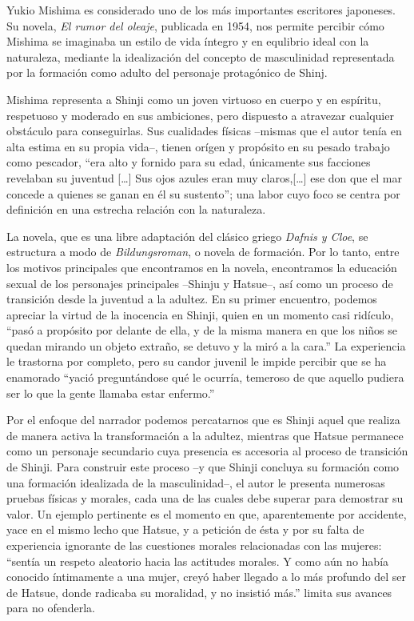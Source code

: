 Yukio Mishima es considerado uno de los más importantes escritores japoneses.
Su novela, \emph{El rumor del oleaje}, publicada en 1954,  nos permite percibir cómo Mishima se imaginaba un estilo de vida íntegro y en equlibrio ideal con la naturaleza, mediante la idealización del concepto de  masculinidad representada por la formación como adulto del  personaje protagónico de Shinj.

Mishima representa a Shinji como un joven virtuoso en cuerpo y en espíritu, respetuoso y moderado en sus ambiciones, pero dispuesto a atravezar cualquier obstáculo para conseguirlas. Sus cualidades físicas --mismas que el autor tenía en alta estima en su propia vida--, tienen orígen y propósito en su pesado trabajo como pescador, ``era alto y fornido para su edad, únicamente sus facciones revelaban su juventud [\ldots] Sus ojos azules eran muy claros,[\ldots] ese don que el mar concede a quienes se ganan en él su sustento''; una labor cuyo foco se centra por definición en una estrecha relación con la naturaleza.

La novela, que es una libre adaptación del clásico griego \emph{Dafnis y Cloe}, se estructura a modo de \emph{Bildungsroman}, o novela de formación.
Por lo tanto, entre los motivos principales que encontramos en la novela, encontramos la educación sexual de los personajes principales --Shinju y Hatsue--, así como un proceso de transición desde la juventud a la adultez.
 En su primer encuentro, podemos apreciar la virtud de la inocencia en Shinji, quien en un momento casi ridículo, ``pasó a propósito por delante de ella, y de la misma manera en que los niños se quedan mirando un objeto extraño, se detuvo y la miró a la cara.''%
La experiencia le trastorna por completo, pero su candor juvenil le impide percibir que se ha enamorado  ``yació preguntándose qué le ocurría, temeroso de que aquello pudiera ser lo que la gente llamaba estar enfermo.'' %

Por el enfoque del narrador podemos percatarnos que es Shinji aquel que realiza de manera activa la transformación a la adultez, mientras que Hatsue permanece como un personaje secundario cuya presencia es accesoria al proceso de transición de Shinji.
Para construir este proceso --y que Shinji concluya su formación como una formación idealizada de la masculinidad--, el autor le presenta numerosas pruebas físicas y morales, cada una de las cuales debe superar para demostrar su valor. Un ejemplo pertinente es el momento en que, aparentemente por accidente, yace en el mismo lecho que Hatsue, y a petición de ésta y por su falta de experiencia ignorante de las cuestiones morales relacionadas con las mujeres: ``sentía un respeto aleatorio hacia las actitudes morales. Y como aún no había conocido íntimamente a una mujer, creyó haber llegado a lo más profundo del ser de Hatsue, donde radicaba su moralidad, y no insistió más.'' limita sus avances para no ofenderla.


